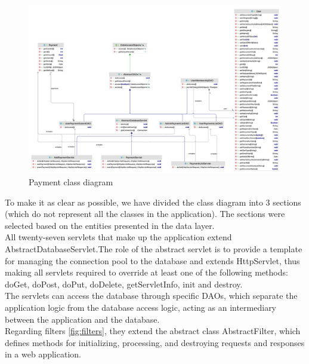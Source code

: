 \begin{figure}[H]
    \centering
    \includegraphics[width=1\textwidth]{images/classPaymentUser.png}
    \caption{Payment class diagram}
    \label{fig:payment}
\end{figure}

To make it as clear as possible, we have divided the class diagram into 3 sections (which do not represent all the classes in the application). The sections were selected based on the entities presented in the data layer.\\
All twenty-seven servlets that make up the application extend AbstractDatabaseServlet.The role of the abstract servlet is to provide a template for managing the connection pool to the database and extends HttpServlet, thus making all servlets required to override at least one of the following methods: doGet, doPost, doPut, doDelete, getServletInfo, init and destroy.\\
The servlets can access the database through specific DAOs, which separate the application logic from the database access logic, acting as an intermediary between the application and the database.\\
Regarding filters \ref{fig:filters}, they extend the abstract class AbstractFilter, which defines methods for initializing, processing, and destroying requests and responses in a web application.